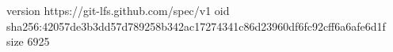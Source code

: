 version https://git-lfs.github.com/spec/v1
oid sha256:42057de3b3dd57d789258b342ac17274341c86d23960df6fc92cff6a6afe6d1f
size 6925
